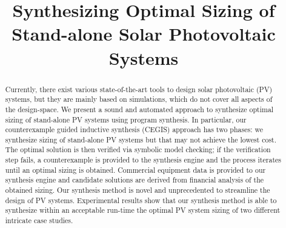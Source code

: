 \documentclass[10pt,conference]{IEEEtran}
\begin{document}
\title{Synthesizing Optimal Sizing of Stand-alone Solar Photovoltaic Systems\\
}

\author{
\and
{}
}

\maketitle

\begin{abstract}
Currently, there exist various state-of-the-art tools to design solar photovoltaic (PV) systems, but they are mainly based on simulations, which do not cover all aspects of the design-space. We present a sound and automated approach to synthesize optimal sizing of stand-alone PV systems using program synthesis. 
In particular, our counterexample guided inductive synthesis (CEGIS) approach has two phases: we synthesize sizing of stand-alone PV systems but that may not achieve the lowest cost. The optimal solution is then verified via symbolic model checking; if the verification step fails, a counterexample is provided to the synthesis engine and the process iterates until an optimal sizing is obtained. Commercial equipment data is provided to our synthesis engine and candidate solutions are derived from financial analysis of the obtained sizing. Our synthesis method is novel and unprecedented to streamline the design of PV systems. Experimental results show that our synthesis method is able to synthesize within an acceptable run-time the optimal PV system sizing of two different intricate case studies.
\end{abstract}


\end{document}
